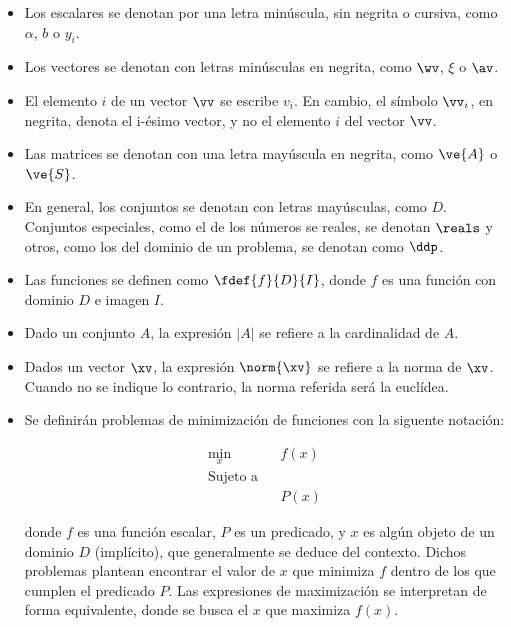 \begin{itemize}

\item Los escalares se denotan por una letra minúscula, sin negrita o cursiva, como $\alpha$, $b$ o $y_i$.

\item Los vectores se denotan con letras minúsculas en negrita, como $\wv$, $\xi$ o $\av$.

\item El elemento $i$ de un vector $\vv$ se escribe $v_i$. En cambio, el símbolo $\vv_i$, en negrita, denota el i-ésimo vector, y no el elemento $i$ del vector $\vv$.

\item Las matrices se denotan con una letra mayúscula en negrita, como $\ve{A}$ o $\ve{S}$.

\item En general, los conjuntos se denotan con letras mayúsculas, como $D$. Conjuntos especiales, como el de los números se reales, se denotan $\reals$ y otros, como los del dominio de un problema, se denotan como $\ddp$.

\item Las funciones se definen como $\fdef{f}{D}{I}$, donde $f$ es una función con dominio $D$ e imagen $I$.

\item Dado un conjunto $A$, la expresión $|A|$ se refiere a la cardinalidad de $A$.

\item Dados un vector $\xv$, la expresión $\norm{\xv}$ se refiere a la norma de $\xv$. Cuando no se indique lo contrario, la norma referida será la euclídea.

\item Se definirán problemas de minimización de funciones con la siguente notación:

\begin{equation*}
\begin{aligned}
\underset{x}{\text{min}} & & f(x)\\
\text{Sujeto a} \\
& &  P(x)
\end{aligned}
\end{equation*}

donde $f$ es una función escalar, $P$ es un predicado, y $x$ es algún objeto de un dominio $D$ (implícito), que generalmente se deduce del contexto. Dichos problemas plantean encontrar el valor de $x$ que minimiza $f$ dentro de los que cumplen el predicado $P$.  Las expresiones de maximización se interpretan de forma equivalente, donde se busca el $x$ que maximiza $f(x)$.


\end{itemize}
